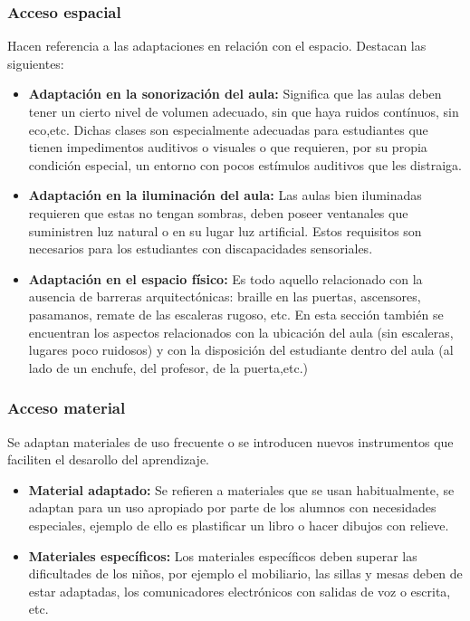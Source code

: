 \subsubsection{Acceso espacial}
Hacen referencia a las adaptaciones en relación con el espacio. Destacan las siguientes:
\begin{itemize}
    \item \textbf{Adaptación en la sonorización del aula:} Significa que las aulas deben tener un cierto nivel de volumen adecuado, sin que haya ruidos contínuos, sin eco,etc. Dichas clases son especialmente adecuadas para estudiantes que tienen impedimentos auditivos o visuales o que requieren, por su propia condición especial, un entorno con pocos estímulos auditivos que les distraiga.
    \item \textbf{Adaptación en la iluminación del aula:} Las aulas bien iluminadas requieren que estas no tengan sombras, deben poseer ventanales que suministren luz natural o en su lugar luz artificial. Estos requisitos son necesarios para los estudiantes con discapacidades sensoriales.
    \item \textbf{Adaptación en el espacio físico:} Es todo aquello relacionado con la ausencia de barreras arquitectónicas:  braille en las puertas, ascensores, pasamanos, remate de las escaleras rugoso, etc. En esta sección también se encuentran los aspectos relacionados con la ubicación del aula (sin escaleras, lugares poco ruidosos) y con la disposición del estudiante dentro del aula (al lado de un enchufe, del profesor, de la puerta,etc.)
\end{itemize}

\subsubsection{Acceso material}
Se adaptan materiales de uso frecuente o se introducen nuevos instrumentos que faciliten el desarollo del aprendizaje.
\begin{itemize}
    \item \textbf{Material adaptado:} Se refieren a materiales que se usan habitualmente, se adaptan para un uso apropiado por parte de los alumnos con necesidades especiales, ejemplo de ello es plastificar un libro o hacer dibujos con relieve.
    \item \textbf{Materiales específicos:} Los materiales específicos deben superar las dificultades de los niños, por ejemplo el mobiliario, las sillas y mesas deben de estar adaptadas, los comunicadores electrónicos con salidas de voz o escrita, etc.
\end{itemize}

